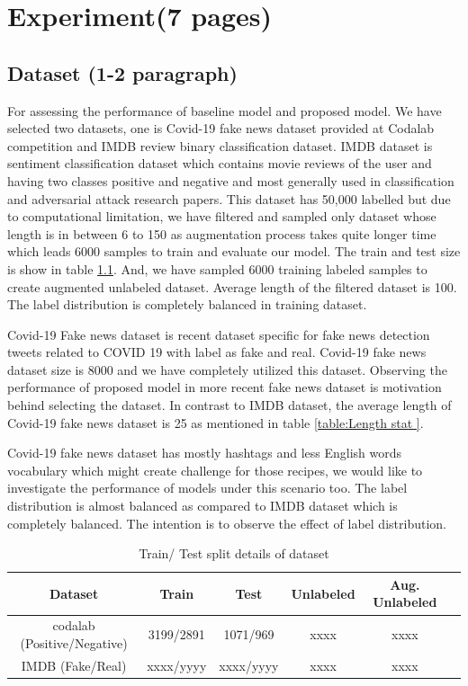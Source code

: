 \documentclass[%
	BCOR=8mm, %
	DIV=12, 
	toc=bibliography, %
	toc=listof, %
	oneside, %
	egregdoesnotlikesansseriftitles, %
	]{scrbook}
\begin{document}
\chapter{Experiment(7 pages)}


\section{Dataset (1-2 paragraph)}
For assessing the performance of baseline model and proposed model. We have selected two datasets, one is Covid-19 fake news  dataset provided at Codalab competition 
and IMDB review binary classification dataset. IMDB dataset is sentiment classification dataset which contains movie reviews of the user and having two classes positive and
 negative and most generally used in classification and adversarial attack research papers. This dataset has 50,000 labelled but due to computational limitation, we have filtered 
 and sampled only dataset whose length is in between 6 to 150 as augmentation process takes quite longer time which leads  6000 samples to train and evaluate our model. The 
 train and test size is show in table \ref{table:train/test table }. And, we have sampled 6000 training labeled samples to create augmented unlabeled dataset.  Average length of the 
 filtered dataset is 100.  The label distribution is completely balanced in training dataset. 

Covid-19 Fake news dataset  is recent dataset specific for fake news detection tweets related to COVID 19 with label as fake and real.  Covid-19 fake news dataset size is 8000 and 
we have completely utilized this dataset. Observing the performance of proposed model in more recent fake news dataset is motivation behind selecting the dataset. In contrast to 
IMDB dataset, the average length of Covid-19 fake news dataset is 25 as mentioned in table \ref{table:Length stat }.

Covid-19 fake news dataset has mostly hashtags and less English words vocabulary which might create challenge for those recipes, we would like to investigate the performance
 of models under this scenario too. The label distribution is almost balanced as compared to IMDB dataset which is completely balanced. The intention is to observe the effect 
 of label distribution.
 
\begin{table}[!h]
\centering
\begin{tabular}{ |c|c|c|c|c|c| } 
\hline
Dataset & Train & Test & Unlabeled & Aug. Unlabeled \\
\hline
codalab (Positive/Negative) & 3199/2891 & 1071/969 & xxxx & xxxx \\ 
IMDB (Fake/Real) & xxxx/yyyy & xxxx/yyyy & xxxx & xxxx \\
\hline
\end{tabular}
\caption[Train/Augment test data]{Train/ Test split details of dataset }
\label{table:train/test table }
\end{table}
\end{document}

